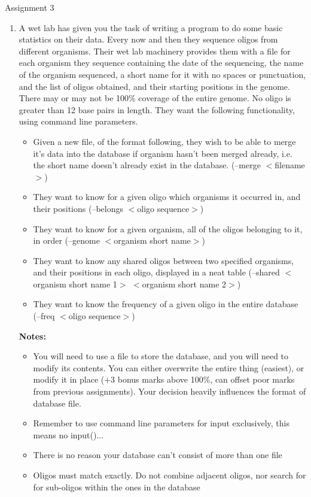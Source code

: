 \hypertarget{assignment3}{Assignment 3}
\begin{enumerate}
	\item A wet lab has given you the task of    writing a program to do some basic statistics on their data. Every    now and then they sequence oligos from different organisms. Their    wet lab machinery provides them with a file for each organism they    sequence containing the date of the sequencing, the name of the    organism sequenced, a short name for it with no spaces or    punctuation, and the list of oligos obtained, and their starting    positions in the genome. There may or may not be 100\% coverage of    the entire genome. No oligo is greater than 12 base pairs in    length. They want the following functionality, using command line    parameters.     
\begin{itemize}
	\item Given a new file, of the format following, they wish to be able to merge it's data into the database if organism hasn't been merged already, i.e. the short name doesn't already exist in the database. (--merge $<$filename$>$)
	\item They want to know for a given oligo which organisms it occurred in, and their positions (--belongs $<$oligo sequence$>$)
	\item They want to know for a given organism, all of the oligos belonging to it, in order (--genome $<$organism short name$>$)
	\item They want to know any shared oligos between two specified organisms, and their positions in each oligo, displayed in a neat table (--shared $<$organism short name 1$>$ $<$organism short name 2$>$)
	\item They want to know the frequency of a given oligo in the entire database (--freq $<$oligo sequence$>$)
\end{itemize}\textbf{Notes:}
\begin{itemize}
	\item You will need to use a file to store the database, and you will need to modify its contents. You can either overwrite the entire thing (easiest), or modify it in place (+3 bonus marks above 100\%, can offset poor marks from previous assignments). Your decision heavily influences the format of database file.
	\item Remember to use command line parameters for input exclusively, this means no input()...
	\item There is no reason your database can't consist of more than one file
	\item Oligos must match exactly. Do not combine adjacent oligos, nor search for for sub-oligos within the ones in the database

\end{itemize}
\end{enumerate}
